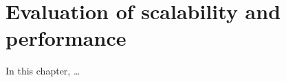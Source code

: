 \chapter{Evaluation of scalability and performance}
\label{chap:evaluation}

In this chapter, \ldots











